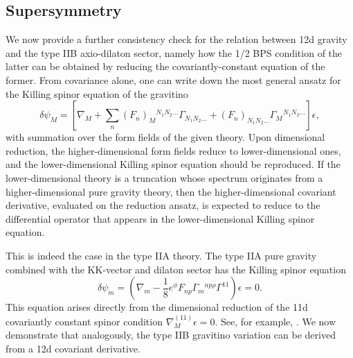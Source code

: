 \subsection{Supersymmetry}
We now provide a further consistency check for the relation between 12d gravity and the type IIB axio-dilaton sector, namely how the 1/2 BPS condition of the latter can be obtained by reducing the covariantly-constant equation of the former.
From covariance alone, one can write down the most general ansatz for the Killing spinor equation of the gravitino
\begin{equation}
\delta\psi_M
= 
\left[
\nabla_M+\sum_n(F_{n})_M{}^{N_1N_2...}\Gamma_{N_1 N_2...} 
+ (F_{n})_{N_1N_2...}\Gamma_M{}^{N_1N_2...}
\right]\epsilon,
\end{equation}
with summation over the form fields of the given theory.
Upon dimensional reduction, the higher-dimensional form fields reduce to lower-dimensional ones, and the lower-dimensional Killing spinor equation should be reproduced.
If the lower-dimensional theory is a truncation whose spectrum originates from a higher-dimensional pure gravity theory, then the higher-dimensional covariant derivative, evaluated on the reduction ansatz, is expected to reduce to the differential operator that appears in the lower-dimensional Killing spinor equation.

This is indeed the case in the type IIA theory.
The type IIA pure gravity combined with the KK-vector and dilaton sector has the Killing spinor equation
\begin{equation}
\delta \psi_m =
\left(
\nabla_m - \frac{1}{8}e^\phi F_{np}\Gamma_m{}^{np\rho} \Gamma^{11}
\right)\epsilon = 0.
\label{IIA Killing spinor equation}
\end{equation}
This equation arises directly from the dimensional reduction of the 11d covariantly constant spinor condition $\nabla^{(11)}_M\epsilon = 0$. See, for example, \cite{Becker:2006dvp}.
We now demonstrate that analogously, the type IIB gravitino variation can be derived from a 12d covariant derivative.

